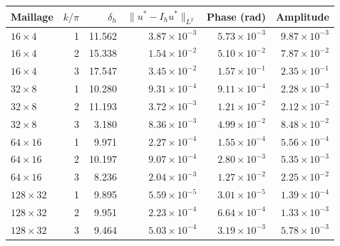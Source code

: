 \begin{tabular}{lrrrrr}
\toprule
Maillage & \(k/\pi\) & \(\delta_h\) & \(\|u^*-I_hu^*\|_{L^2}\) & Phase (rad) & Amplitude \\
\midrule
\(16\times4\) & 1 & 11.562 & \(3.87\times10^{-3}\) & \(5.73\times10^{-3}\) & \(9.87\times10^{-3}\) \\
\(16\times4\) & 2 & 15.338 & \(1.54\times10^{-2}\) & \(5.10\times10^{-2}\) & \(7.87\times10^{-2}\) \\
\(16\times4\) & 3 & 17.547 & \(3.45\times10^{-2}\) & \(1.57\times10^{-1}\) & \(2.35\times10^{-1}\) \\
\(32\times8\) & 1 & 10.280 & \(9.31\times10^{-4}\) & \(9.11\times10^{-4}\) & \(2.28\times10^{-3}\) \\
\(32\times8\) & 2 & 11.193 & \(3.72\times10^{-3}\) & \(1.21\times10^{-2}\) & \(2.12\times10^{-2}\) \\
\(32\times8\) & 3 & 3.180 & \(8.36\times10^{-3}\) & \(4.99\times10^{-2}\) & \(8.48\times10^{-2}\) \\
\(64\times16\) & 1 & 9.971 & \(2.27\times10^{-4}\) & \(1.55\times10^{-4}\) & \(5.56\times10^{-4}\) \\
\(64\times16\) & 2 & 10.197 & \(9.07\times10^{-4}\) & \(2.80\times10^{-3}\) & \(5.35\times10^{-3}\) \\
\(64\times16\) & 3 & 8.236 & \(2.04\times10^{-3}\) & \(1.27\times10^{-2}\) & \(2.25\times10^{-2}\) \\
\(128\times32\) & 1 & 9.895 & \(5.59\times10^{-5}\) & \(3.01\times10^{-5}\) & \(1.39\times10^{-4}\) \\
\(128\times32\) & 2 & 9.951 & \(2.23\times10^{-4}\) & \(6.64\times10^{-4}\) & \(1.33\times10^{-3}\) \\
\(128\times32\) & 3 & 9.464 & \(5.03\times10^{-4}\) & \(3.19\times10^{-3}\) & \(5.78\times10^{-3}\) \\
\bottomrule
\end{tabular}
